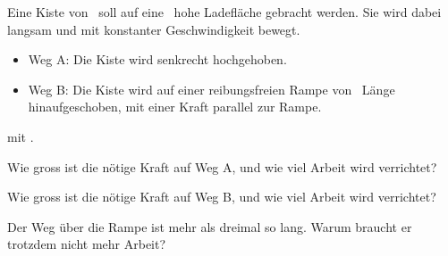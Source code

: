 Eine Kiste von \mKO\ soll auf eine \hKO\ hohe Ladefläche gebracht werden. Sie wird dabei langsam und mit konstanter Geschwindigkeit bewegt.
\begin{itemize}
 \item Weg A: Die Kiste wird senkrecht hochgehoben.
 \item Weg B: Die Kiste wird auf einer reibungsfreien Rampe von \LRO\ Länge hinaufgeschoben, mit einer Kraft parallel zur Rampe.
\end{itemize}
 mit \gO.

\begin{abcliste}
\abc
Wie gross ist die nötige Kraft auf Weg A, und wie viel Arbeit wird verrichtet?

\abc
Wie gross ist die nötige Kraft auf Weg B, und wie viel Arbeit wird verrichtet?

\abc
Der Weg über die Rampe ist mehr als dreimal so lang. Warum braucht er trotzdem nicht mehr Arbeit?
\end{abcliste}
